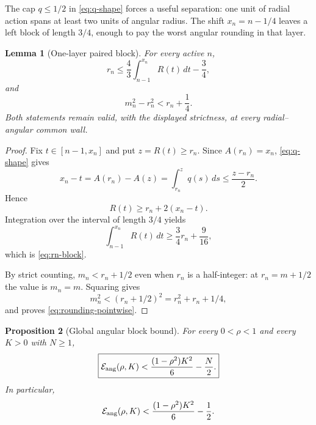 \documentclass[11pt]{article}
\newtheorem{lemma}{Lemma}
\newtheorem{proposition}[lemma]{Proposition}
\theoremstyle{remark}
\begin{document}
The cap $q\leq1/2$ in \eqref{eq:q-shape} forces a useful separation:
one unit of radial action spans at least two units of angular radius.  The
shift $x_n=n-1/4$ leaves a left block of length $3/4$, enough to pay the
worst angular rounding in that layer.

\begin{lemma}[One-layer paired block]
\label{lem:one-layer}
For every active $n$,
\begin{equation}
 r_n
 \leq\frac43\int_{n-1}^{x_n}R(t)\,dt-\frac34,
 \label{eq:rn-block}
\end{equation}
and
\begin{equation}
 m_n^2-r_n^2<r_n+\frac14.
 \label{eq:rounding-pointwise}
\end{equation}
Both statements remain valid, with the displayed strictness, at every
radial--angular common wall.
\end{lemma}

\begin{proof}
Fix $t\in[n-1,x_n]$ and put $z=R(t)\geq r_n$.  Since
$A(r_n)=x_n$, \eqref{eq:q-shape} gives
\[
 x_n-t=A(r_n)-A(z)
 =\int_{r_n}^{z}q(s)\,ds
 \leq\frac{z-r_n}{2}.
\]
Hence
\[
 R(t)\geq r_n+2(x_n-t).
\]
Integration over the interval of length $3/4$ yields
\[
 \int_{n-1}^{x_n}R(t)\,dt
 \geq\frac34r_n+\frac9{16},
\]
which is \eqref{eq:rn-block}.

By strict counting, $m_n<r_n+1/2$ even when $r_n$ is a half-integer:
at $r_n=m+1/2$ the value is $m_n=m$.  Squaring gives
\[
 m_n^2<(r_n+1/2)^2=r_n^2+r_n+1/4,
\]
and proves \eqref{eq:rounding-pointwise}.
\end{proof}

\begin{proposition}[Global angular block bound]
\label{prop:global-E}
For every $0<\rho<1$ and every $K>0$ with $N\geq1$,
\begin{equation}
 \boxed{
 \mathcal E_{\rm ang}(\rho,K)
 <\frac{(1-\rho^2)K^2}{6}-\frac N2.}
 \label{eq:global-E-bound}
\end{equation}
In particular,
\begin{equation}
 \mathcal E_{\rm ang}(\rho,K)
 <\frac{(1-\rho^2)K^2}{6}-\frac12.
 \label{eq:smooth-E-bound}
\end{equation}
\end{proposition}
\end{document}
